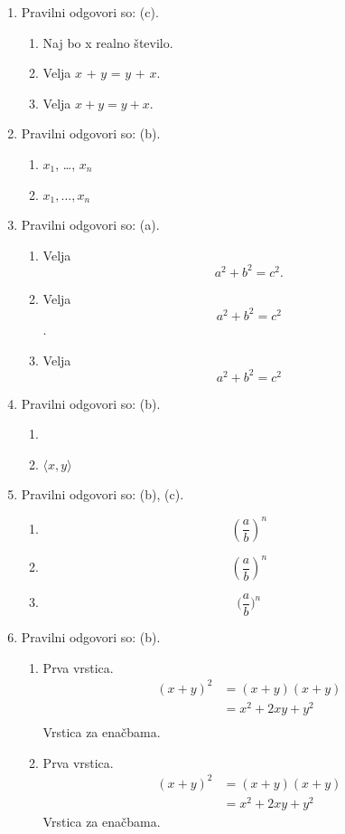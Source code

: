 \documentclass[11pt]{article}
\begin{document}
\begin{enumerate}
    \item Pravilni odgovori so: (c).
    \begin{enumerate}
        \item Naj bo x realno število.
        \item Velja \(x\) + \(y\) = \(y\) + \(x\).
        \item Velja \(x + y = y + x\).
    \end{enumerate}

    \item Pravilni odgovori so: (b).
    \begin{enumerate}
        \item \(x_1\), \dots, \(x_n\)
        \item \(x_1, \ldots, x_n\)
    \end{enumerate}

    \item Pravilni odgovori so: (a).
    \begin{enumerate}
        \item
Velja
\[
  a^2 + b^2 = c^2.
\]
        \item
Velja
\[
  a^2 + b^2 = c^2
\]
.
        \item
Velja
\[
  a^2 + b^2 = c^2
\]
    \end{enumerate}

    \item Pravilni odgovori so: (b).
    \begin{enumerate}
        \item \(<x, y>\)
        \item \(\langle x, y \rangle\)
    \end{enumerate}

    \item Pravilni odgovori so: (b), (c).
    \begin{enumerate}
        \item \[ (\frac{a}{b})^n \]
        \item \[ \left(\frac{a}{b}\right)^n \]
        \item \[ \Big(\frac{a}{b}\Big)^n \]
    \end{enumerate}

    \item Pravilni odgovori so: (b).
    \begin{enumerate}
        \item Prva vrstica.
\begin{align*}
  (x + y)^2 &= (x + y)(x + y) \\
  &= x^2 + 2 x y + y^2 \\
\end{align*}
        Vrstica za enačbama.
        \item Prva vrstica.
\begin{align*}
  (x + y)^2 &= (x + y)(x + y) \\
  &= x^2 + 2 x y + y^2
\end{align*}
        Vrstica za enačbama.
    \end{enumerate}


\end{enumerate}
\end{document}
